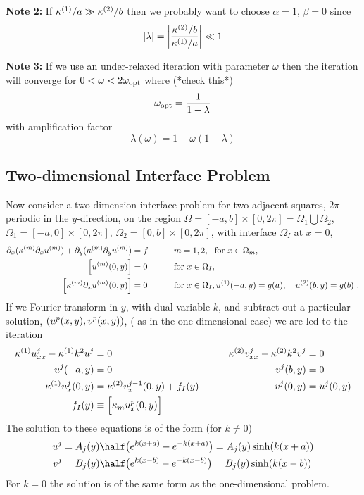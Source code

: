 \documentclass[11pt]{article}
\begin{document}
{\bf Note 2:} If $\kappa^{(1)}/a \gg \kappa^{(2)}/b$ then we probably want to choose $\alpha=1$, $\beta=0$  since
\begin{equation}
   \left\vert \lambda \right\vert = 
   \left\vert \kappa^{(2)}/b \over \kappa^{(1)}/a  \right\vert \ll 1 
\end{equation}

{\bf Note 3:} If we use an under-relaxed iteration with parameter $\omega$ then the iteration 
will converge for $0< \omega < 2\omega_{\rm opt}$ where (*check this*)
\begin{equation}
   \omega_{\rm opt} = { 1 \over 1 - \lambda }
\end{equation}
with amplification factor
\begin{equation}
   \lambda(\omega) = 1 -\omega( 1 - \lambda) 
\end{equation}


\clearpage
\subsection{Two-dimensional Interface Problem}


Now consider a two dimension interface problem for two adjacent squares, $2\pi$-periodic in the $y$-direction,
on the region $\Omega = [-a,b]\times[0,2\pi] = \Omega_1 \bigcup \Omega_2 $, $\Omega_1=[-a,0]\times[0,2\pi]$, 
$\Omega_2=[0,b]\times[0,2\pi]$,
 with interface $\Omega_I$ at $x=0$,
\begin{alignat}{3}
  \partial_x( \kappa^{(m)} \partial_x u^{(m)} ) + \partial_y( \kappa^{(m)} \partial_y u^{(m)} ) &= f &&\qquad m=1,2, ~~\text{for $x\in \Omega_m$}, \\
  \Big[ u^{(m)}(0,y) \Big] &= 0  &&\qquad \text{for $x\in \Omega_I$}, \\
  \Big[ \kappa^{(m)} \partial_x u^{(m)}(0,y) \Big] &= 0 &&\qquad \text{for $x\in \Omega_I$},
  u^{(1)}(-a,y)=g(a), \quad u^{(2)}(b,y)=g(b)  ~.
\end{alignat}
If we Fourier transform in $y$, with dual variable $k$, and subtract out a particular solution, $(u^p(x,y),v^p(x,y))$, ( as in
the one-dimensional case) we are led to the iteration
\begin{alignat}{3}
  \kappa^{(1)} u_{xx}^j - \kappa^{(1)} k^2 u^j  &= 0 &  \kappa^{(2)} v_{xx}^j - \kappa^{(2)} k^2 v^j &= 0 \\
    u^j(-a,y)&=0      &  v^j(b,y)&= 0 \\
  \kappa^{(1)} u^j_x(0,y) &= \kappa^{(2)} v^{j-1}_x(0,y) + f_I(y)  \qquad  & v^j(0,y) &= u^{j}(0,y)  \\
   f_I(y) &\equiv \Big[\kappa_mu^p_x(0,y) \Big]
\end{alignat}
The solution to these equations is of the form (for $k\ne 0$)
\begin{align*}
  u^j &= A_j(y)\half\big(e^{k(x+a)} - e^{-k(x+a)}\big) = A_j(y)\sinh(k(x+a)) \\
  v^j &= B_j(y)\half\big(e^{k(x-b)} - e^{-k(x-b)}\big) = B_j(y)\sinh(k(x-b))
\end{align*}
For $k=0$ the solution is of the same form as the one-dimensional problem.
\end{document}
